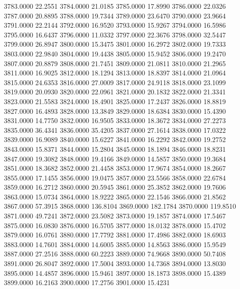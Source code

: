 3783.0000     22.2551
3784.0000     21.0185
3785.0000     17.8990
3786.0000     22.0326
3787.0000     20.8895
3788.0000     19.7344
3789.0000     23.6470
3790.0000     23.9664
3791.0000     22.2144
3792.0000     16.9520
3793.0000     15.9267
3794.0000     16.5986
3795.0000     16.6437
3796.0000     11.0332
3797.0000     22.3676
3798.0000     32.5447
3799.0000     26.8947
3800.0000     15.3475
3801.0000     16.2972
3802.0000     19.7333
3803.0000     22.9840
3804.0000     19.4438
3805.0000     15.9452
3806.0000     19.2470
3807.0000     20.8879
3808.0000     21.7451
3809.0000     21.0811
3810.0000     21.2965
3811.0000     16.9025
3812.0000     18.1294
3813.0000     18.8397
3814.0000     21.0964
3815.0000     24.6353
3816.0000     27.0009
3817.0000     24.9118
3818.0000     23.1099
3819.0000     20.0930
3820.0000     22.0961
3821.0000     20.1832
3822.0000     21.3341
3823.0000     21.5583
3824.0000     18.4901
3825.0000     17.2437
3826.0000     18.8819
3827.0000     16.4893
3828.0000     13.3849
3829.0000     18.6384
3830.0000     15.4390
3831.0000     14.7750
3832.0000     16.9505
3833.0000     18.3672
3834.0000     27.2273
3835.0000     36.4341
3836.0000     35.4205
3837.0000     27.1614
3838.0000     17.0322
3839.0000     16.9089
3840.0000     15.6227
3841.0000     16.2292
3842.0000     19.2752
3843.0000     15.8371
3844.0000     15.2804
3845.0000     18.1894
3846.0000     18.8231
3847.0000     19.3082
3848.0000     19.4166
3849.0000     14.5857
3850.0000     19.3684
3851.0000     18.3682
3852.0000     21.4458
3853.0000     17.9674
3854.0000     18.2667
3855.0000     17.1455
3856.0000     19.0475
3857.0000     23.5566
3858.0000     22.6784
3859.0000     16.2712
3860.0000     20.5945
3861.0000     25.3852
3862.0000     19.7606
3863.0000     15.0734
3864.0000     18.9222
3865.0000     22.1546
3866.0000     21.8562
3867.0000     57.3915
3868.0000    136.8104
3869.0000    182.1784
3870.0000    119.8510
3871.0000     49.7241
3872.0000     23.5082
3873.0000     19.1857
3874.0000     17.5467
3875.0000     16.0830
3876.0000     16.5705
3877.0000     18.0132
3878.0000     15.4702
3879.0000     16.0761
3880.0000     17.7792
3881.0000     17.4986
3882.0000     18.6903
3883.0000     14.7601
3884.0000     14.6005
3885.0000     14.8563
3886.0000     15.9549
3887.0000     27.2516
3888.0000     60.2223
3889.0000     74.9668
3890.0000     50.7408
3891.0000     26.8047
3892.0000     17.5004
3893.0000     14.7368
3894.0000     13.8030
3895.0000     14.4857
3896.0000     15.9461
3897.0000     18.1873
3898.0000     15.4389
3899.0000     16.2163
3900.0000     17.2756
3901.0000     15.4231
